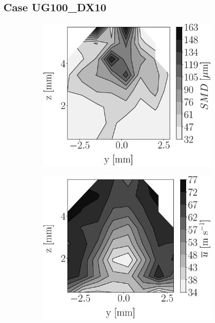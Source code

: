 \clearpage

\subsection{Case UG100\_DX10}





\begin{figure}[h!]
\flushleft
\begin{subfigure}[b]{0.22\textwidth}
	\centering
   \includegraphics[scale=0.17]{./part2_developments/figures_ch5_resolved_JICF/injectors_SLI/uG100_dx10_x05_SMD_map.eps}
\end{subfigure}
   \hspace{0.17in}
\begin{subfigure}[b]{0.22\textwidth}
	\centering
   \includegraphics[scale=0.17]{./part2_developments/figures_ch5_resolved_JICF/injectors_SLI/uG100_dx10_x05_ux_mean_map.eps}

\end{subfigure}
\end{figure}
